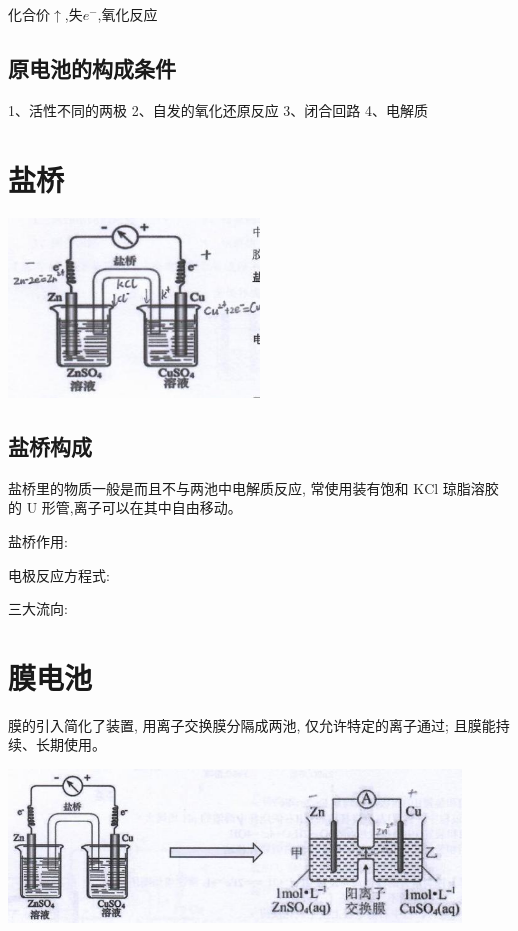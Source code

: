 \documentclass[10pt,cn]{elegantbook}
\begin{document}
化合价$\uparrow$,失$e^{-}$,氧化反应

\subsection{原电池的构成条件}

1、活性不同的两极 
2、自发的氧化还原反应
3、闭合回路 
4、电解质

\section{盐桥}

\begin{center}
	\includegraphics[max width=0.5\textwidth]{image/c14.jpg}
\end{center}

\subsection{盐桥构成}

盐桥里的物质一般是而且不与两池中电解质反应, 常使用装有饱和 \(\mathrm{{KCl}}\) 琼脂溶胶的 \(\mathrm{U}\) 形管,离子可以在其中自由移动。

盐桥作用:

电极反应方程式: 

三大流向: 

\section{膜电池}

膜的引入简化了装置, 用离子交换膜分隔成两池, 仅允许特定的离子通过; 且膜能持续、长期使用。

\begin{center}
	\includegraphics[max width=0.9\textwidth]{image/c16-1.jpg}
\end{center}
\end{document}
